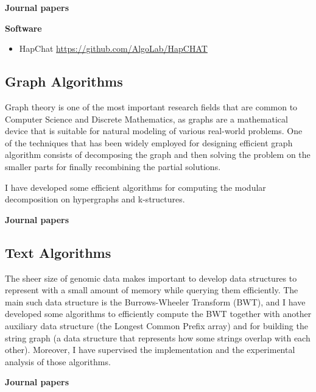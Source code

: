 \documentclass[11pt,a4paper,roman]{moderncv}
\begin{document}
\textbf{Journal papers}

\cite{ciccolellaMALVIRUSIntegratedApplication2022}
\cite{DBLP:journals/bmcbi/BerettaPZVB18}
\cite{DBLP:journals/tcbb/PirolaVBSB12}
\cite{DBLP:journals/tcbb/BonizzoniVDPR10}
\cite{DBLP:journals/ijbra/BonizzoniVDM05}
\cite{DBLP:journals/jcst/BonizzoniVDL03}

\textbf{Software}

\begin{itemize}
	\item
	      HapChat \url{https://github.com/AlgoLab/HapCHAT}
\end{itemize}

\subsection{Graph Algorithms}\label{graph-algorithms}

Graph theory is one of the most
important research fields that are common to Computer Science and
Discrete Mathematics, as graphs are a mathematical device that is
suitable for natural modeling of various real-world problems. One of the
techniques that has been widely employed for designing efficient graph
algorithm consists of decomposing the graph and then solving the problem
on the smaller parts for finally recombining the partial solutions.

I have developed some efficient algorithms for
computing the modular decomposition on hypergraphs and k-structures.


\textbf{Journal papers}

\cite{DBLP:journals/jal/BonizzoniV99}


\subsection{Text Algorithms}\label{bwt}

The sheer size of genomic data makes important to develop data structures to
represent with a small amount of memory while querying them efficiently.
The main such data structure is the Burrows-Wheeler Transform (BWT), and I have
developed some algorithms to efficiently compute the BWT together with another
auxiliary data structure (the Longest Common Prefix array) and for building the
string graph (a data structure that represents how some strings overlap with
each other).
Moreover, I have supervised the implementation and the experimental analysis of
those algorithms.


\textbf{Journal papers}
\end{document}

